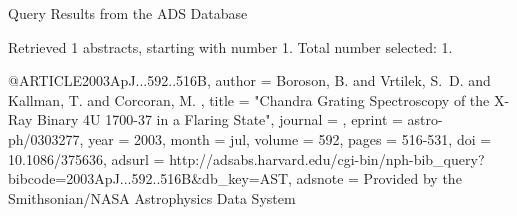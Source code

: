 Query Results from the ADS Database


Retrieved 1 abstracts, starting with number 1.  Total number selected: 1.

@ARTICLE{2003ApJ...592..516B,
   author = {{Boroson}, B. and {Vrtilek}, S.~D. and {Kallman}, T. and {Corcoran}, M.
	},
    title = "{Chandra Grating Spectroscopy of the X-Ray Binary 4U 1700-37 in a Flaring State}",
  journal = {\apj},
   eprint = {astro-ph/0303277},
     year = 2003,
    month = jul,
   volume = 592,
    pages = {516-531},
      doi = {10.1086/375636},
   adsurl = {http://adsabs.harvard.edu/cgi-bin/nph-bib_query?bibcode=2003ApJ...592..516B&db_key=AST},
  adsnote = {Provided by the Smithsonian/NASA Astrophysics Data System}
}


